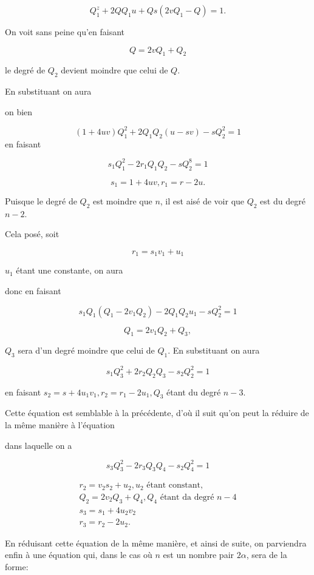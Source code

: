 \documentclass{article}
\begin{document}
\[
Q_{1}^{z}+2 Q Q_{1} u+Q s\left(2 v Q_{1}-Q\right)=1 .
\]

On voit sans peine qu'en faisant

\[
Q=2 v Q_{1}+Q_{2}
\]

le degré de \(Q_{2}\) devient moindre que celui de \(Q\).

En substituant on aura

on bien

\[
(1+4 u v) Q_{1}^{2}+2 Q_{1} Q_{2}(u-s v)-s Q_{2}^{2}=1
\]
en faisant

\[
s_{1} Q_{1}^{2}-2 r_{1} Q_{1} Q_{2}-s Q_{2}^{8}=1
\]

\[
s_{1}=1+4 u v, r_{1}=r-2 u .
\]

Puisque le degré de \(Q_{2}\) est moindre que \(n\), il est aisé de voir que \(Q_{2}\) est du degré \(n-2\).

Cela posé, soit

\[
r_{1}=s_{1} v_{1}+u_{1}
\]

\(u_{1}\) étant une constante, on aura

donc en faisant

\[
s_{1} Q_{1}\left(Q_{1}-2 v_{1} Q_{2}\right)-2 Q_{1} Q_{2} u_{1}-s Q_{2}^{2}=1
\]

\[
Q_{1}=2 v_{1} Q_{2}+Q_{3},
\]

\(Q_{3}\) sera d'un degré moindre que celui de \(Q_{1}\). En substituant on aura

\[
s_{1} Q_{3}^{2}+2 r_{2} Q_{2} Q_{3}-s_{2} Q_{2}^{2}=1
\]

en faisant \(s_{2}=s+4 u_{1} v_{1}, r_{2}=r_{1}-2 u_{1}, Q_{3}\) étant du degré \(n-3\).

Cette équation est semblable à la précédente, d'où il suit qu'on peut la réduire de la même manière à l'équation

dans laquelle on a

\[
s_{3} Q_{3}^{2}-2 r_{3} Q_{3} Q_{4}-s_{2} Q_{4}^{2}=1
\]

\[
\begin{gathered}
r_{2}=v_{2} s_{2}+u_{2}, u_{2} \text { étant constant, } \\
Q_{2}=2 v_{2} Q_{3}+Q_{4}, Q_{4} \text { étant da degré } n-4 \\
s_{3}=s_{1}+4 u_{2} v_{2} \\
r_{3}=r_{2}-2 u_{2} .
\end{gathered}
\]

En réduisant cette équation de la même manière, et ainsi de suite, on parviendra enfin à une équation qui, dans le cas où \(n\) est un nombre pair \(2 \alpha\), sera de la forme:
\end{document}

